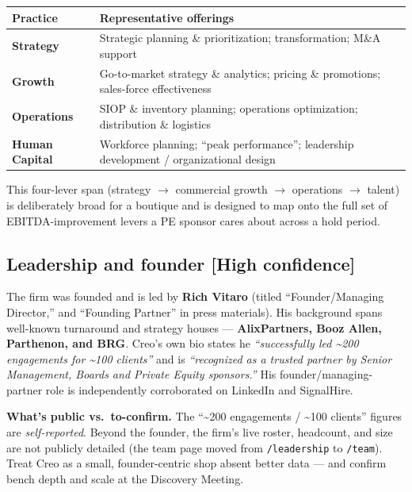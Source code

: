 \documentclass[11pt]{article}
\newcommand{\high}{\textcolor{green!45!black}{\textbf{[High confidence]}}}
\begin{document}
\begin{center}
\renewcommand{\arraystretch}{1.3}
\begin{tabular}{>{\bfseries}p{2.6cm} p{10.8cm}}
\toprule
Practice & Representative offerings \\
\midrule
Strategy & Strategic planning \& prioritization; transformation; M\&A support \\
Growth & Go-to-market strategy \& analytics; pricing \& promotions; sales-force effectiveness \\
Operations & SIOP \& inventory planning; operations optimization; distribution \& logistics \\
Human Capital & Workforce planning; ``peak performance''; leadership development / organizational design \\
\bottomrule
\end{tabular}
\end{center}

This four-lever span (strategy $\rightarrow$ commercial growth $\rightarrow$
operations $\rightarrow$ talent) is deliberately broad for a boutique and is
designed to map onto the full set of EBITDA-improvement levers a PE sponsor
cares about across a hold period.

\subsection{Leadership and founder \high}
The firm was founded and is led by \textbf{Rich Vitaro} (titled
``Founder/Managing Director,'' and ``Founding Partner'' in press materials).
His background spans well-known turnaround and strategy houses ---
\textbf{AlixPartners, Booz Allen, Parthenon, and BRG}. Creo's own bio states he
\emph{``successfully led \textasciitilde{}200 engagements for \textasciitilde{}100
clients''} and is \emph{``recognized as a trusted partner by Senior Management,
Boards and Private Equity sponsors.''} His founder/managing-partner role is
independently corroborated on LinkedIn and SignalHire.

\begin{takeaway}
\textbf{What's public vs.\ to-confirm.} The ``\textasciitilde{}200 engagements /
\textasciitilde{}100 clients'' figures are \emph{self-reported}. Beyond the
founder, the firm's live roster, headcount, and size are not publicly detailed
(the team page moved from \texttt{/leadership} to \texttt{/team}). Treat Creo as
a small, founder-centric shop absent better data --- and confirm bench depth and
scale at the Discovery Meeting.
\end{takeaway}
\end{document}
